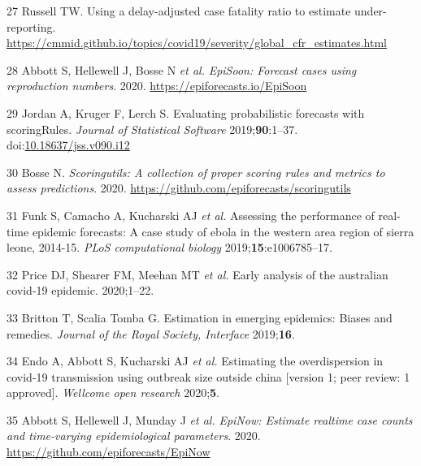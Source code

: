\documentclass[
]{article}
\begin{document}
\leavevmode\hypertarget{ref-Russell:BFVkJ6lQ}{}%
27 Russell TW. Using a delay-adjusted case fatality ratio to estimate
under-reporting.
\url{https://cmmid.github.io/topics/covid19/severity/global_cfr_estimates.html}

\leavevmode\hypertarget{ref-episoon}{}%
28 Abbott S, Hellewell J, Bosse N \emph{et al.} \emph{EpiSoon: Forecast
cases using reproduction numbers}. 2020.
\url{https://epiforecasts.io/EpiSoon}

\leavevmode\hypertarget{ref-scoringrules}{}%
29 Jordan A, Kruger F, Lerch S. Evaluating probabilistic forecasts with
scoringRules. \emph{Journal of Statistical Software}
2019;\textbf{90}:1--37.
doi:\href{https://doi.org/10.18637/jss.v090.i12}{10.18637/jss.v090.i12}

\leavevmode\hypertarget{ref-scoringutils}{}%
30 Bosse N. \emph{Scoringutils: A collection of proper scoring rules and
metrics to assess predictions}. 2020.
\url{https://github.com/epiforecasts/scoringutils}

\leavevmode\hypertarget{ref-Funk2019cc}{}%
31 Funk S, Camacho A, Kucharski AJ \emph{et al.} Assessing the
performance of real-time epidemic forecasts: A case study of ebola in
the western area region of sierra leone, 2014-15. \emph{PLoS
computational biology} 2019;\textbf{15}:e1006785--17.

\leavevmode\hypertarget{ref-Price:2020dh}{}%
32 Price DJ, Shearer FM, Meehan MT \emph{et al.} Early analysis of the
australian covid-19 epidemic. 2020;1--22.

\leavevmode\hypertarget{ref-Britton:2019gf}{}%
33 Britton T, Scalia Tomba G. Estimation in emerging epidemics: Biases
and remedies. \emph{Journal of the Royal Society, Interface}
2019;\textbf{16}.

\leavevmode\hypertarget{ref-10.12688ux2fwellcomeopenres.15842.1}{}%
34 Endo A, Abbott S, Kucharski AJ \emph{et al.} Estimating the
overdispersion in covid-19 transmission using outbreak size outside
china {[}version 1; peer review: 1 approved{]}. \emph{Wellcome open
research} 2020;\textbf{5}.

\leavevmode\hypertarget{ref-epinow}{}%
35 Abbott S, Hellewell J, Munday J \emph{et al.} \emph{EpiNow: Estimate
realtime case counts and time-varying epidemiological parameters}. 2020.
\url{https://github.com/epiforecasts/EpiNow}
\end{document}
